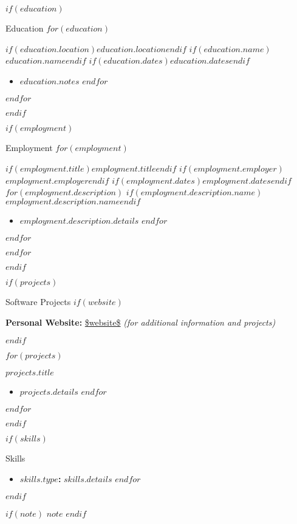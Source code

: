 \documentclass{mcdowellcv}
\begin{document}
  \makeheader

  $if(education)$
  \begin{cvsection}{Education}
    $for(education)$
    \begin{cvsubsection}
      {$if(education.location)$$education.location$$endif$}
      {$if(education.name)$$education.name$$endif$}
      {$if(education.dates)$$education.dates$$endif$}
      \begin{itemize}
        $for(education.notes)$
        \item $education.notes$
        $endfor$
      \end{itemize}
    \end{cvsubsection}
    $endfor$
  \end{cvsection}
  $endif$

  $if(employment)$
  \begin{cvsection}{Employment}
    $for(employment)$
    \begin{cvsubsection}
      {$if(employment.title)$$employment.title$$endif$}
      {$if(employment.employer)$$employment.employer$$endif$}
      {$if(employment.dates)$$employment.dates$$endif$}
      $for(employment.description)$
      $if(employment.description.name)$$employment.description.name$$endif$
      \begin{itemize}
        $for(employment.description.details)$
        \item $employment.description.details$
        $endfor$
      \end{itemize}
      $endfor$
    \end{cvsubsection}
    $endfor$
  \end{cvsection}
  $endif$
  
  $if(projects)$
  \begin{cvsection}{Software Projects}
    $if(website)$
    \begin{cvsubsectiontext}{\textbf{Personal Website:} \url{$website$} \textit{(for additional information and projects)}}
    \end{cvsubsectiontext}
    $endif$
      
    $for(projects)$
    \begin{cvsubsection}{$projects.title$}{}{}
      \begin{itemize}
        $for(projects.details)$
        \item $projects.details$
        $endfor$
      \end{itemize}
    \end{cvsubsection}
    $endfor$
  \end{cvsection}
  $endif$
  
  $if(skills)$
  \begin{cvsection}{Skills}
    \begin{cvsubsection}{}{}{}
      \begin{itemize}
        $for(skills)$
        \item \textbf{$skills.type$: }$skills.details$
        $endfor$
      \end{itemize}
    \end{cvsubsection}
  \end{cvsection}
  $endif$
  
  $if(note)$
  \textbf{\footnotesize $note$}
  $endif$
\end{document}
